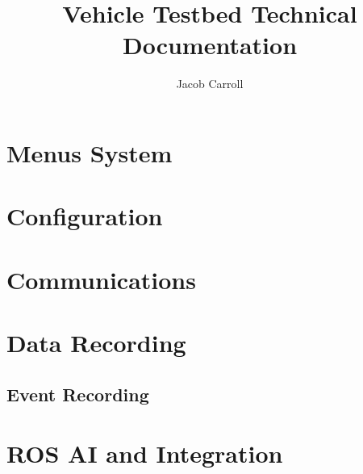 \documentclass{article}
\title{Vehicle Testbed Technical Documentation}
\author{Jacob Carroll}
\date{ }
\begin{document}
 
\maketitle
 
\section{Menus System}

 
\section{Configuration}

 
\section{Communications}


\section{Data Recording}
\subsection{Event Recording}


\section{ROS AI and Integration}

\end{document}
